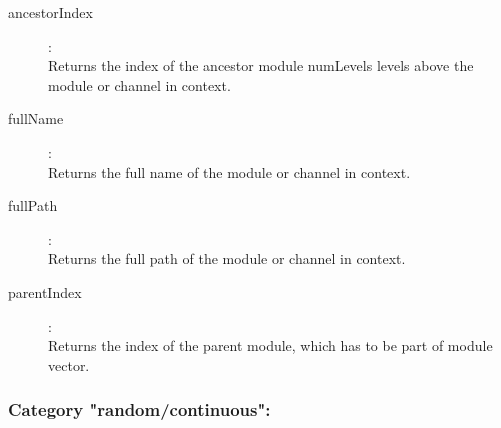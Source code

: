 \begin{description}
\item[ancestorIndex]:  \\
    Returns the index of the ancestor module numLevels levels above the module or channel in context.
\item[fullName]:  \\
    Returns the full name of the module or channel in context.
\item[fullPath]:  \\
    Returns the full path of the module or channel in context.
\item[parentIndex]:  \\
    Returns the index of the parent module, which has to be part of module vector.

\end{description}

\subsubsection{Category "random/continuous":}
\label{sec:ned-functions:category-random-continuous}


